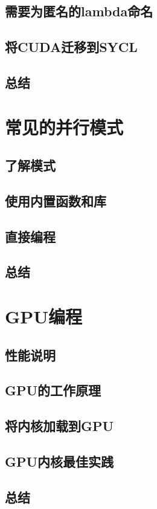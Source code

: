 \documentclass[11pt,a4paper,UTF8]{ctexart}
\begin{document}
		\subsection{需要为匿名的lambda命名}
		\subsection{将CUDA迁移到SYCL}
		\subsection{总结}
	\section{常见的并行模式}
		\subsection{了解模式}
		\subsection{使用内置函数和库}
		\subsection{直接编程}
		\subsection{总结}
	\section{GPU编程}
		\subsection{性能说明}
		\subsection{GPU的工作原理}
		\subsection{将内核加载到GPU}
		\subsection{GPU内核最佳实践}
		\subsection{总结}
\end{document}
